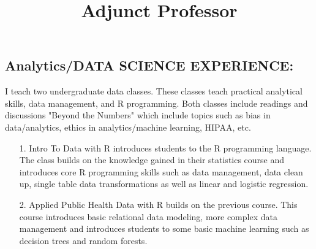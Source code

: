 \documentclass[line, mm, 10pt]{res}
\begin{document}
\address{\href{mailto:andy.choens@gmail.com}{andy.choens@gmail.com}}
\address{\href{tel:(518) 275-5984}{(518) 275-5984}}

\begin{resume}


  \section{Analytics/DATA SCIENCE EXPERIENCE:}


  \title{Adjunct Professor}
  \begin{position}
    I teach two undergraduate data classes. These classes teach practical
    analytical skills, data management, and R programming. Both classes include
    readings and discussions "Beyond the Numbers" which include topics such as
    bias in data/analytics, ethics in analytics/machine learning, HIPAA, etc.
    \newline
    \begin{itemize}
      \item[1.] Intro To Data with R introduces students to the R programming
      language. The class builds on the knowledge gained in their statistics
      course and introduces core R programming skills such as data management,
      data clean up, single table data transformations as well as linear and
      logistic regression.
      \item[2.] Applied Public Health Data with R builds on the previous course. This course introduces basic relational data modeling, more complex data management and introduces students to some basic machine learning such as decision trees and random forests.
    \end{itemize}


\end{position}
\end{resume}
\end{document}
